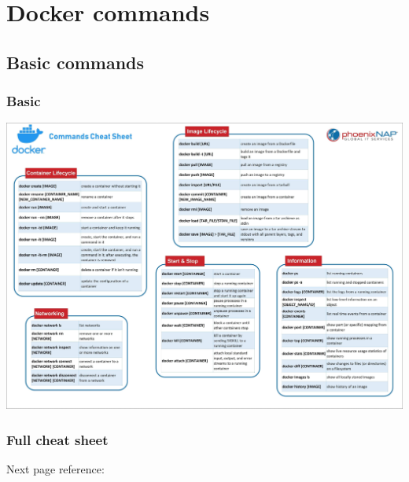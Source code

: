 \documentclass{beamer}
\begin{document}
\section{Docker commands}
\subsection{Basic commands}
\begin{frame}
    \frametitle{Basic}
    \centering\includegraphics[height=0.9\textheight]{cheat_sheet.jpeg}
    \cite{small_chear_sheet}
\end{frame}

\begin{frame}
    \frametitle{Full cheat sheet}
    Next page reference: \cite{cheat_sheet_full}
\end{frame}
{

}
\end{document}
